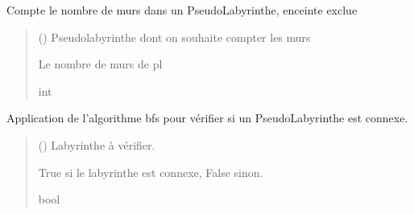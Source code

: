 \documentclass[letterpaper,10pt,french]{sphinxmanual}
\begin{document}
\begin{fulllineitems}
\label{\detokenize{src:src.algorithmes_docs.nb_murs}}
\pysigstartsignatures
{}
\pysigstopsignatures
\sphinxAtStartPar
Compte le nombre de murs dans un Pseudo\sphinxhyphen{}Labyrinthe, enceinte exclue
\begin{quote}\begin{description}
\sphinxAtStartPar
{} ({\hyperref[\detokenize{src:src.utilites.PseudoLabyrinthe}]{}}) \textendash{} Pseudo\sphinxhyphen{}labyrinthe dont on souhaite compter les murs

\sphinxAtStartPar
Le nombre de murs de pl

\sphinxAtStartPar
int

\end{description}\end{quote}

\end{fulllineitems}


\begin{fulllineitems}
\label{\detokenize{src:src.algorithmes_docs.verifie_connexite}}
\pysigstartsignatures
{}
\pysigstopsignatures
\sphinxAtStartPar
Application de l’algorithme bfs pour vérifier si un Pseudo\sphinxhyphen{}Labyrinthe est connexe.
\begin{quote}\begin{description}
\sphinxAtStartPar
{} ({\hyperref[\detokenize{src:src.utilites.PseudoLabyrinthe}]{}}) \textendash{} Labyrinthe à vérifier.

\sphinxAtStartPar
True si le labyrinthe est connexe, False sinon.

\sphinxAtStartPar
bool

\end{description}\end{quote}

\end{fulllineitems}
\end{document}
